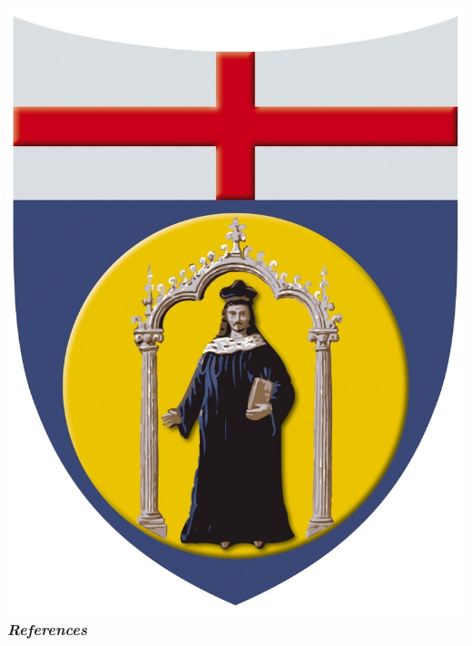 \documentclass[a4paper,11pt]{beamer} %
\newcommand{\LogoUnivGenova}{\protect\includegraphics[scale=0.015]{fig_genova.JPG}} %
\begin{document}
\begin{frame}
\frametitle{\LogoUnivGenova {} \emph{\small{References}}}
\renewcommand{\section}[2]{}
\vspace{-2mm}
\begin{tiny}
\begin{multicols}{2}
%
\end{multicols}
\end{tiny}
%
%
%
%
%

%
%
\end{frame}
\end{document}
